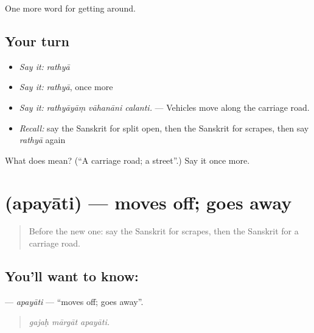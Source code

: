 \begin{grammarlens}[title={What you've built}]
One more word for getting around.
\end{grammarlens}

\subsection*{Your turn}
\begin{itemize}
\raggedright
  \item \emph{Say it:} \emph{rathyā}
  \item \emph{Say it:} \emph{rathyā}, once more
  \item \emph{Say it:} \emph{rathyāyāṃ vāhanāni calanti.} — Vehicles move along the carriage road.
  \item \emph{Recall:} say the Sanskrit for split open, then the Sanskrit for scrapes, then say \emph{rathyā} again
\end{itemize}

\begin{tcolorbox}[breakable,colback=teal!4,colframe=teal!35!black,title={Before you move on}]
What does  mean? (\textquotedblleft{}A carriage road; a street\textquotedblright{}.) Say it once more.
\end{tcolorbox}
\section[\texorpdfstring{\sk{अपयाति} (apayāti)}{अपयाति (apayāti)}]{ (apayāti) — moves off; goes away}

\label{lesson:SA-C411-apayati}



\begin{quote}
Before the new one: say the Sanskrit for scrapes, then the Sanskrit for a carriage road.
\end{quote}

\subsection*{You'll want to know: }
\textbf{} — \emph{apayāti} — \textquotedblleft{}moves off; goes away\textquotedblright{}.

\begin{quote}
  
\end{quote}

\begin{quote}
\emph{gajaḥ mārgāt apayāti.}
\end{quote}

